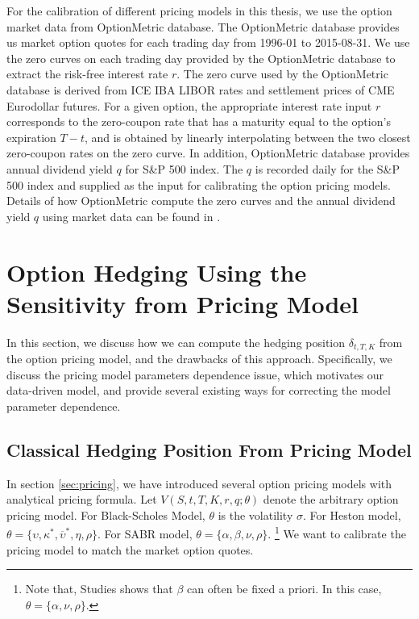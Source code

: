 \documentclass[letterpaper,12pt,titlepage,oneside,final]{book}
\numberwithin{equation}{section}
\theoremstyle{definition}
\begin{document}
For the calibration of different pricing models in this thesis, we use the option market data from OptionMetric \cite{optionmetrics2008ivy} database. The OptionMetric \cite{optionmetrics2008ivy} database provides us market option quotes for each trading day from 1996-01 to 2015-08-31. We use the zero curves on each trading day provided by the OptionMetric \cite{optionmetrics2008ivy} database to extract the risk-free interest rate $r$. The zero curve used by the OptionMetric database is derived from ICE
IBA LIBOR rates and settlement prices of CME Eurodollar futures. For a given option, the appropriate interest rate input $r$ corresponds to the zero-coupon rate that has a maturity equal to the option’s expiration $T-t$, and is obtained by linearly interpolating between the two closest zero-coupon rates on the zero curve. In addition, OptionMetric \cite{optionmetrics2008ivy} database provides annual  dividend yield $q$ for S\&P 500 index. The $q$ is recorded daily for the S\&P 500 index and supplied as the input for calibrating the option pricing models.  Details of how OptionMetric compute the zero curves and the annual dividend yield $q$  using market data can be found in \cite{optionmetrics2008ivy}.


\section{Option Hedging Using the Sensitivity from Pricing Model}
In this section, we discuss how we can compute the hedging position $\delta_{t,T,K}$ from the option pricing model, and the drawbacks of this approach. Specifically, we discuss the pricing model parameters dependence issue, which motivates our data-driven model,  and provide several existing ways for correcting the model parameter dependence. 
\subsection{Classical Hedging Position From Pricing Model}
\label{sec:Classical}
In section \ref{sec:pricing}, we have introduced several option pricing models with analytical pricing formula. 
Let $V(S,t,T,K,r,q;\theta)$ denote the arbitrary option pricing model. For Black-Scholes Model,  $\theta$ is the volatility $\sigma$. For Heston model, $\theta=\{\upsilon,\kappa^*,\overline{\upsilon}^*,\eta,\rho \}$. For SABR model, $\theta=\{\alpha,\beta,\nu,\rho \}$. \footnote{Note that, Studies \cite{hulloptimal,hagan2002managing,hagan2017bartlett} shows that $\beta$ can often be fixed a priori. In this case, $\theta=\{\alpha,\nu,\rho \}$.}
We want to calibrate the pricing model to match the market option quotes. 
\end{document}
